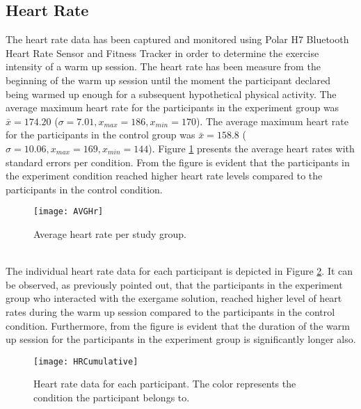 \subsection{Heart Rate}
The heart rate data has been captured and monitored using Polar H7 Bluetooth Heart Rate Sensor and Fitness Tracker in order to determine the exercise intensity of a warm up session. The heart rate has been measure from the beginning of the warm up session until the moment the participant declared being warmed up enough for a subsequent hypothetical physical activity. The average maximum heart rate for the participants in the experiment group was \begin{math}\bar{x} = 174.20 \end{math} (\begin{math} \sigma = 7.01, x_{max}=186, x_{min}=170 \end{math}). The average maximum heart rate for the participants in the control group was \begin{math}\bar{x} = 158.8 \end{math} (\begin{math} \sigma = 10.06, x_{max}= 169, x_{min}= 144\end{math}). Figure \ref{fig:hrdata} presents the average heart rates with standard errors per condition. From the figure is evident that the participants in the experiment condition reached higher heart rate levels compared to the participants in the control condition.\\ %
\begin{figure}[h]
    \centering
    \texttt{[image: AVGHr]}
    \caption{Average heart rate per study group.}
    \label{fig:hrdata}
\end{figure}\\
The individual heart rate data for each participant is depicted in Figure \ref{fig:hrCumulative}. It can be observed, as previously pointed out, that the participants in the experiment group who interacted with the exergame solution, reached higher level of heart rates during the warm up session compared to the participants in the control condition. Furthermore, from the figure is evident that the duration of the warm up session for the participants in the experiment group is significantly longer also.\pagebreak
\begin{figure}[h]
    \centering
    \texttt{[image: HRCumulative]}
    \caption{Heart rate data for each participant. The color represents the condition the participant belongs to.}
    \label{fig:hrCumulative}
\end{figure}\\
